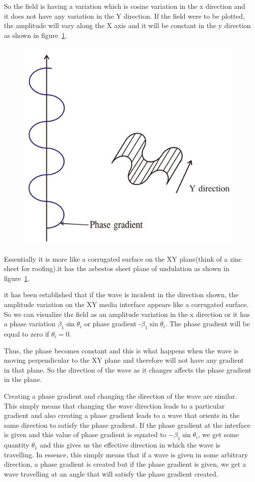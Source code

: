 So the field is having a variation which is cosine variation in the x direction and it does not have any variation in the Y direction. If the field were to be plotted, the amplitude will vary along the X axis and it will be constant in the y direction as shown in figure~\ref{fig:group30c}.
\begin{figure}[h]
\centering
\includegraphics[width=.7\linewidth]{./graphics/group30c}
\caption{}
\label{fig:group30c}
\end{figure}

Essentially it is more like a corrugated surface on the XY plane(think of a zinc sheet for roofing).it has the asbestos sheet plane of undulation as shown in figure~\ref{fig:group30c}.

it has been established that if the wave is incident in the direction shown, the amplitude variation on the XY media interface appears like a corrugated surface. So we can visualize the field as an amplitude variation in the x direction or it has a phase variation $\beta_1\sin \theta_i$ or phase gradient -$\beta_1\sin\theta_i$. The phase gradient will be equal to zero if $\theta_i=0$.

Thus, the phase becomes constant and this is what happens when the wave is moving perpendicular to the XY plane and therefore will not have any gradient in that plane. So the direction of the wave as it changes affects the phase gradient in the plane.

Creating a phase gradient and changing the direction of the wave are similar. This simply means that changing the wave direction leads to a particular gradient and also creating a phase gradient leads to a wave that orients in the same direction to satisfy the phase gradient. If the phase gradient at the interface is given and this value of phase gradient is equated to $-\beta_1 \sin \theta_i$, we get some quantity $\theta_1$ and this gives us the effective direction in which the wave is travelling. In essence, this simply means that if a wave is given in some arbitrary direction, a phase gradient is created but if the phase gradient is given, we get a wave travelling at an angle that will satisfy the phase gradient created.

